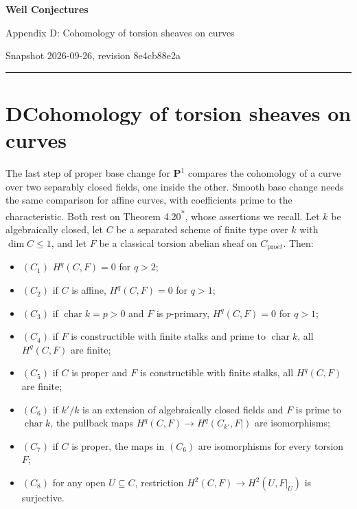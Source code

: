 \documentclass[11pt]{article}
\newcommand{\bpout}[1]{#1\textsuperscript{\hyperlink{bp-outside}{\ensuremath{\ast}}}}
\begin{document}
\pagestyle{plain}
\begin{center}
{\LARGE\bfseries Weil Conjectures\par}
\vspace{0.7em}
{\large Appendix D: Cohomology of torsion sheaves on curves\par}
\vspace{0.5em}
{\small\color{bpmuted}Snapshot 2026-09-26, revision 8e4cb88e2a\par}
\end{center}
\vspace{0.5em}
{\small\tableofcontents}
\bigskip\hrule\bigskip

\section*{\texorpdfstring{D\quad Cohomology of torsion sheaves on curves}{D Cohomology of torsion sheaves on curves}}
\label{bp1}%
\label{bp2}%
The last step of proper base change for \(\mathbf P^1\) compares the cohomology of a curve over two separably closed fields, one inside the other. Smooth base change needs the same comparison for affine curves, with coefficients prime to the characteristic. Both rest on Theorem \bpout{4.20}, whose assertions we recall. Let \(k\) be algebraically closed, let \(C\) be a separated scheme of finite type over \(k\) with \(\dim C\leq1\), and let \(F\) be a classical torsion abelian sheaf on \(C_{\mathrm{pro}\acute{e}t}\). Then:

\begin{itemize}
\item \((C_{1})\) \(H^q(C,F)=0\) for \(q>2\);
\item \((C_{2})\) if \(C\) is affine, \(H^q(C,F)=0\) for \(q>1\);
\item \((C_{3})\) if \(\operatorname{char}k=p>0\) and \(F\) is \(p\)-primary, \(H^q(C,F)=0\) for \(q>1\);
\item \((C_{4})\) if \(F\) is constructible with finite stalks and prime to \(\operatorname{char}k\), all \(H^q(C,F)\) are finite;
\item \((C_{5})\) if \(C\) is proper and \(F\) is constructible with finite stalks, all \(H^q(C,F)\) are finite;
\item \((C_{6})\) if \(k'/k\) is an extension of algebraically closed fields and \(F\) is prime to \(\operatorname{char}k\), the pullback maps \(H^q(C,F)\to H^q(C_{k'},F|)\) are isomorphisms;
\item \((C_{7})\) if \(C\) is proper, the maps in \((C_6)\) are isomorphisms for every torsion \(F\);
\item \((C_{8})\) for any open \(U\subseteq C\), restriction \(H^2(C,F)\to H^2(U,F|_U)\) is surjective.
\end{itemize}
\end{document}
